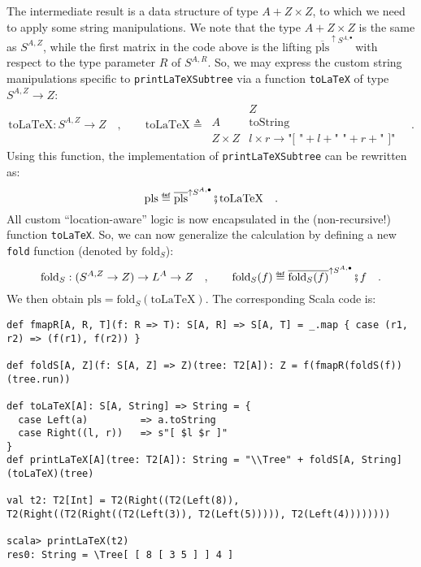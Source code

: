 The intermediate result is a data structure of type $A+Z\times Z$,
to which we need to apply some string manipulations. We note that
the type $A+Z\times Z$ is the same as $S^{A,Z}$, while the first
matrix in the code above is the lifting $\overline{\text{pls}}^{\uparrow S^{A,\bullet}}\,$with
respect to the type parameter $R$ of $S^{A,R}$. So, we may express
the custom string manipulations specific to \lstinline!printLaTeXSubtree!
via a function \lstinline!toLaTeX! of type $S^{A,Z}\rightarrow Z$:
\[
\text{toLaTeX}:S^{A,Z}\rightarrow Z\quad,\quad\quad\text{toLaTeX}\triangleq\,\begin{array}{|c||c|}
 & Z\\
\hline A & \text{toString}\\
Z\times Z & l\times r\rightarrow\text{"[ "}+l+\text{" "}+r+\text{" ]"}
\end{array}\quad.
\]
Using this function, the implementation of \lstinline!printLaTeXSubtree!
can be rewritten as:
\[
\text{pls}\triangleq\overline{\text{pls}}^{\uparrow S^{A,\bullet}}\bef\text{toLaTeX}\quad.
\]
All custom \textsf{``}location-aware\textsf{''} logic is now encapsulated in the (non-recursive!)
function \lstinline!toLaTeX!. So, we can now generalize the calculation
by defining a new \lstinline!fold! function (denoted by $\text{fold}_{S}$):
\begin{equation}
\text{fold}_{S}:(S^{A,Z}\rightarrow Z)\rightarrow L^{A}\rightarrow Z\quad,\quad\quad\text{fold}_{S}(f)\triangleq\overline{\text{fold}_{S}(f)}^{\uparrow S^{A,\bullet}}\bef f\quad.\label{eq:fold-via-recursion-scheme-1}
\end{equation}
We then obtain $\text{pls}=\text{fold}_{S}(\text{toLaTeX})$. The
corresponding Scala code is:
\begin{lstlisting}
def fmapR[A, R, T](f: R => T): S[A, R] => S[A, T] = _.map { case (r1, r2) => (f(r1), f(r2)) }

def foldS[A, Z](f: S[A, Z] => Z)(tree: T2[A]): Z = f(fmapR(foldS(f))(tree.run))

def toLaTeX[A]: S[A, String] => String = {
  case Left(a)         => a.toString
  case Right((l, r))   => s"[ $l $r ]"
}
def printLaTeX[A](tree: T2[A]): String = "\\Tree" + foldS[A, String](toLaTeX)(tree)

val t2: T2[Int] = T2(Right((T2(Left(8)), T2(Right((T2(Right((T2(Left(3)), T2(Left(5))))), T2(Left(4))))))))

scala> printLaTeX(t2)
res0: String = \Tree[ [ 8 [ 3 5 ] ] 4 ]
\end{lstlisting}

